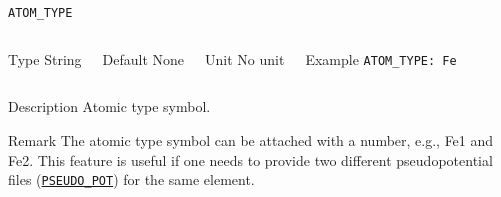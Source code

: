 \begin{frame}[allowframebreaks]{\texttt{ATOM\_TYPE}} \label{ATOM_TYPE}
\vspace*{-12pt}
\begin{columns}
\begin{block}{Type}
String
\end{block}

\begin{block}{Default}
None
\end{block}

\begin{block}{Unit}
No unit
\end{block}

\begin{block}{Example}
\texttt{ATOM\_TYPE: Fe}  
\end{block}
\end{columns}

\begin{block}{Description}
Atomic type symbol. 
\end{block}

\begin{block}{Remark}
The atomic type symbol can be attached with a number, e.g., Fe1 and Fe2. This feature is useful if one needs to provide two different pseudopotential files (\hyperlink{PSEUDO_POT}{\texttt{PSEUDO\_POT}}) for the same element.
\end{block}

\end{frame}


